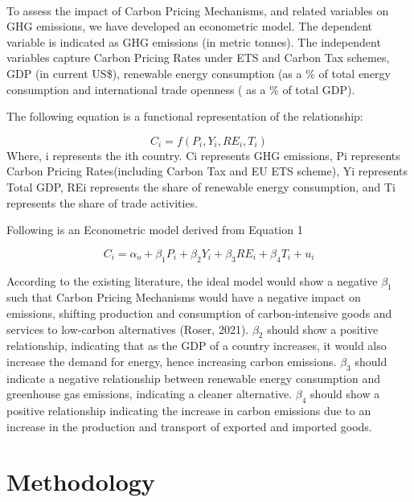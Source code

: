 \documentclass[12pt]{article}
\begin{document}
\paragraph{}
To assess the impact of Carbon Pricing Mechanisms, and related variables on GHG emissions, we have developed an econometric model. The dependent variable is indicated as GHG emissions (in metric tonnes). The independent variables capture Carbon Pricing Rates under ETS and Carbon Tax schemes, GDP (in current US\$), renewable energy consumption (as a \% of total energy consumption and international trade openness ( as a \% of total GDP).
\begin{center}The following equation is a functional representation of the relationship:\end{center}
\begin{equation}
    C_{i} = f( P_{i}, Y_{i}, RE_{i}, T_{i} )
\end{equation}
Where, i represents the ith country. Ci represents GHG emissions, Pi represents Carbon Pricing Rates(including Carbon Tax and EU ETS scheme), Yi represents Total GDP, REi represents the share of renewable energy consumption, and Ti represents the share of trade activities.
\begin{center}Following is an Econometric model derived from Equation 1\end{center}
\begin{equation}
    C_{i} = \alpha_{o} + \beta_{1}P_{i} + \beta_{2}Y_{i} + \beta_{3}RE_{i} + \beta_{4}T_{i} + u_{i}
\end{equation}

According to the existing literature, the ideal model would show a negative \(\beta_{1}\) such that Carbon Pricing Mechanisms would have a negative impact on emissions, shifting production and consumption of carbon-intensive goods and services to low-carbon alternatives (Roser, 2021). \(\beta_{2}\) should show a positive relationship, indicating that as the GDP of a country increases, it would also increase the demand for energy, hence increasing carbon emissions. \(\beta_{3}\) should indicate a negative relationship between renewable energy consumption and greenhouse gas emissions, indicating a cleaner alternative. \(\beta_{4}\) should show a positive relationship indicating the increase in carbon emissions due to an increase in the production and transport of exported and imported goods.



\section{Methodology}
\end{document}
